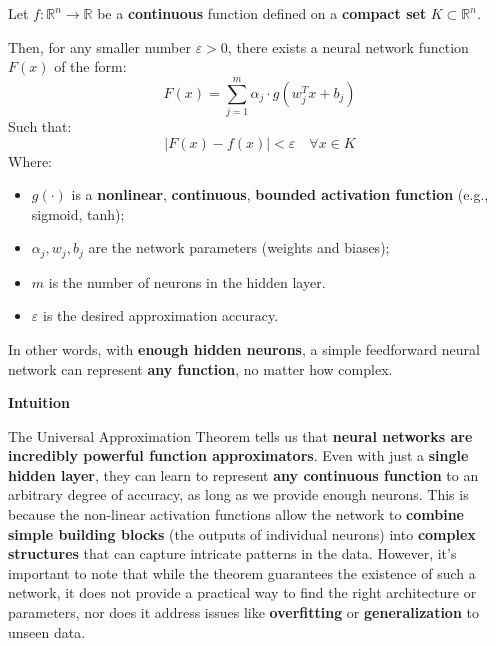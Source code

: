 \begin{theorem}\label{thm:universal-approximation-theorem}
    Let $f : \mathbb{R}^{n} \rightarrow \mathbb{R}$ be a \textbf{continuous} function defined on a \textbf{compact set} $K \subset \mathbb{R}^{n}$.

    \highspace
    Then, for any smaller number $\varepsilon > 0$, there exists a neural network function $F(x)$ of the form:
    \begin{equation}
        F(x) = \displaystyle\sum_{j=1}^{m} \alpha_{j} \cdot g\left(w_{j}^{T} x + b_{j}\right)
    \end{equation}
    Such that:
    \begin{equation}
        \left| F(x) - f(x) \right| < \varepsilon \quad \forall x \in K
    \end{equation}
    Where:
    \begin{itemize}
        \item $g\left(\cdot\right)$ is a \textbf{nonlinear}, \textbf{continuous}, \textbf{bounded activation function} (e.g., sigmoid, tanh);
        \item $\alpha_{j}, w_{j}, b_{j}$ are the network parameters (weights and biases);
        \item $m$ is the number of neurons in the hidden layer.
        \item $\varepsilon$ is the desired approximation accuracy.
    \end{itemize}
    In other words, with \textbf{enough hidden neurons}, a simple feedforward neural network can represent \textbf{any function}, no matter how complex.
\end{theorem}

\highspace
\begin{flushleft}
    \textcolor{Green3}{ \textbf{Intuition}}
\end{flushleft}
The Universal Approximation Theorem tells us that \textbf{neural networks are incredibly powerful function approximators}. Even with just a \textbf{single hidden layer}, they can learn to represent \textbf{any continuous function} to an arbitrary degree of accuracy, as long as we provide enough neurons. This is because the non-linear activation functions allow the network to \textbf{combine simple building blocks} (the outputs of individual neurons) into \textbf{complex structures} that can capture intricate patterns in the data. However, it's important to note that while the theorem guarantees the existence of such a network, it does not provide a practical way to find the right architecture or parameters, nor does it address issues like \textbf{overfitting} or \textbf{generalization} to unseen data.

